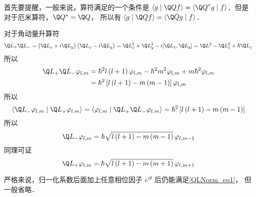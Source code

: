 


首先要提醒，一般来说，算符满足的一个条件是 $\left\langle {g}
 \mathrel{\left | {\vphantom {g {\Q Qf}}}
 \right. \kern-\nulldelimiterspace}
 {{\Q Qf}} \right\rangle  = \left\langle {{{{\Q Q}^ * }g}}
 \mathrel{\left | {\vphantom {{{{\Q Q}^ * }g} f}}
 \right. \kern-\nulldelimiterspace}
 {f} \right\rangle $．但是对于厄米算符，${\Q Q^ * } = \Q Q$， 所以有 $\left\langle {g}
 \mathrel{\left | {\vphantom {g {\Q Qf}}}
 \right. \kern-\nulldelimiterspace}
 {{\Q Qf}} \right\rangle  = \left\langle {{\Q Qg}}
 \mathrel{\left | {\vphantom {{\Q Qg} f}}
 \right. \kern-\nulldelimiterspace}
 {f} \right\rangle $．

对于角动量升算符
\begin{equation}
{\Q L_ + }{\Q L_ - } = \left( {{{\Q L}_x} + i{{\Q L}_y}} \right)\left( {{{\Q L}_x} - i{{\Q L}_y}} \right) = \Q L_x^2 + \Q L_y^2 - i[{\Q L_x},{\Q L_y}] = {\Q L^2} - \Q L_z^2 + \hbar {\Q L_z}
\end{equation} 
所以
\begin{equation}\begin{aligned}
{\Q L_ + }{\Q L_ - }{\varphi _{l,m}} &= {\hbar ^2}l\left( {l + 1} \right){\varphi _{l,m}} - {\hbar ^2}{m^2}{\varphi _{l,m}} + m{\hbar ^2}{\varphi _{l,m}} \\
&= {\hbar ^2}\left[ {l\left( {l + 1} \right) - m\left( {m - 1} \right)} \right]{\varphi _{l,m}}
\end{aligned}\end{equation} 
所以
\begin{equation}\label{QLNorm_eq1}
\left\langle {{{{\Q L}_ - }{\varphi _{l,m}}}}
 \mathrel{\left | {\vphantom {{{{\Q L}_ - }{\varphi _{l,m}}} {{{\Q L}_ + }{\varphi _{l,m}}}}}
 \right. \kern-\nulldelimiterspace}
 {{{{\Q L}_ + }{\varphi _{l,m}}}} \right\rangle  = \left\langle {{{\varphi _{l,m}}}}
 \mathrel{\left | {\vphantom {{{\varphi _{l,m}}} {{{\Q L}_ + }{{\Q L}_ - }{\varphi _{l,m}}}}}
 \right. \kern-\nulldelimiterspace}
 {{{{\Q L}_ + }{{\Q L}_ - }{\varphi _{l,m}}}} \right\rangle  = {\hbar ^2}\left[ {l\left( {l + 1} \right) - m\left( {m - 1} \right)} \right]
\end{equation} 
所以
\begin{equation}
{\Q L_ - }{\varphi _{l,m}} = \hbar \sqrt {l\left( {l + 1} \right) - m\left( {m - 1} \right)} \,{\varphi _{l,m - 1}}
\end{equation}
同理可证
\begin{equation}
{\Q L_ + }{\varphi _{l,m}} = \hbar \sqrt {l\left( {l + 1} \right) - m\left( {m + 1} \right)} \,{\varphi _{l,m + 1}}
\end{equation} 

严格来说，归一化系数后面加上任意相位因子 ${e^{i\theta }}$ 后仍能满足\autoref{QLNorm_eq1}， 但一般省略．



